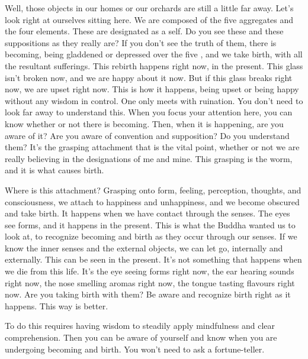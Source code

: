 Well, those objects in our homes or our orchards are still a little far away. Let's look right at ourselves sitting here. We are composed of the five aggregates and the four elements. These  are designated as a self. Do you see these  and these suppositions as they really are? If you don't see the truth of them, there is becoming, being gladdened or depressed over the five , and we take birth, with all the resultant sufferings. This rebirth happens right now, in the present. This glass isn't broken now, and we are happy about it now. But if this glass breaks right now, we are upset right now.  This is how it happens, being upset or being happy without any wisdom in control. One only meets with ruination. You don't need to look far away to understand this. When you focus your attention here, you can know whether or not there is becoming. Then, when it is happening, are you aware of it? Are you aware of convention and supposition? Do you understand them? It's the grasping attachment that is the vital point, whether or not we are really believing in the designations of me and mine. This grasping is the worm, and it is what causes birth.

Where is this attachment? Grasping onto form, feeling, perception, thoughts, and consciousness, we attach to happiness and unhappiness, and we become obscured and take birth. It happens when we have contact through the senses. The eyes see forms, and it happens in the present. This is what the Buddha wanted us to look at, to recognize becoming and birth as they occur through our senses. If we know the inner senses and the external objects, we can let go, internally and externally. This can be seen in the present. It's not something that happens when we die from this life. It's the eye seeing forms right now, the ear hearing sounds right now, the nose smelling aromas right now, the tongue tasting flavours right now. Are you taking birth with them? Be aware and recognize birth right as it happens. This way is better.

To do this requires having wisdom to steadily apply mindfulness and clear comprehension. Then you can be aware of yourself and know when you are undergoing becoming and birth. You won't need to ask a fortune-teller.

